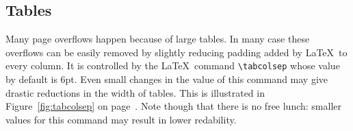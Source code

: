 \documentclass[withtimes]{easychair}
\begin{document}
\subsection{Tables}

Many page overflows happen because of large tables. In many case these
overflows can be easily removed by slightly reducing padding added by
\LaTeX\ to every column. It is controlled by the \LaTeX\ command
\verb|\tabcolsep| whose value by default is 6pt. Even small changes in
the value of this command may give drastic reductions in the width of
tables. This is illustrated in Figure~\ref{fig:tabcolsep} on
page~\pageref{fig:tabcolsep}. Note though that there is no free lunch:
smaller values for this command may result in lower redability.

\end{document}

